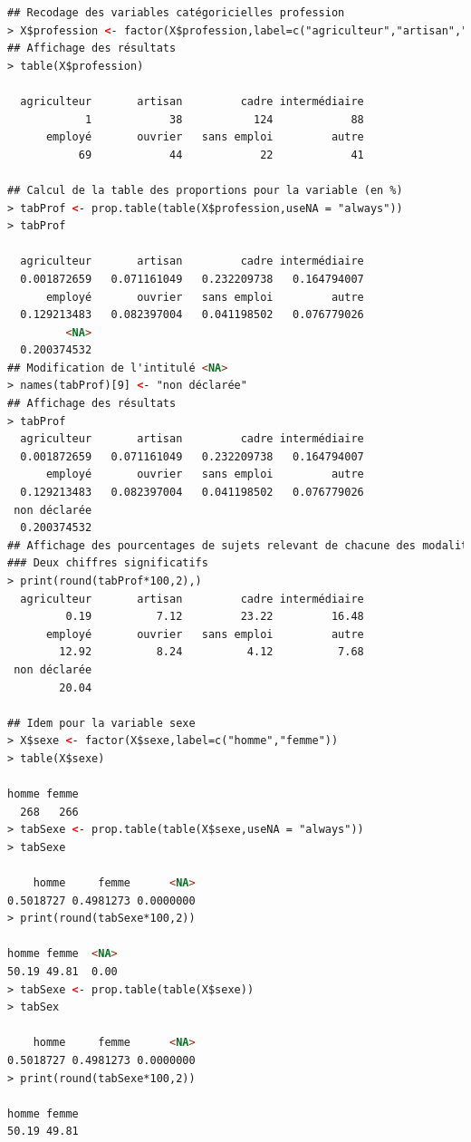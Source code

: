 \begin{lstlisting}[language=html]
## Recodage des variables catégoricielles profession
> X$profession <- factor(X$profession,label=c("agriculteur","artisan","cadre","intermédiaire","employé","ouvrier","sans emploi","autre"))
## Affichage des résultats 
> table(X$profession)

  agriculteur       artisan         cadre intermédiaire 
            1            38           124            88 
      employé       ouvrier   sans emploi         autre 
           69            44            22            41 

## Calcul de la table des proportions pour la variable (en %)           
> tabProf <- prop.table(table(X$profession,useNA = "always"))
> tabProf

  agriculteur       artisan         cadre intermédiaire 
  0.001872659   0.071161049   0.232209738   0.164794007 
      employé       ouvrier   sans emploi         autre 
  0.129213483   0.082397004   0.041198502   0.076779026 
         <NA> 
  0.200374532 
## Modification de l'intitulé <NA>
> names(tabProf)[9] <- "non déclarée"
## Affichage des résultats 
> tabProf
  agriculteur       artisan         cadre intermédiaire 
  0.001872659   0.071161049   0.232209738   0.164794007 
      employé       ouvrier   sans emploi         autre 
  0.129213483   0.082397004   0.041198502   0.076779026 
 non déclarée 
  0.200374532 
## Affichage des pourcentages de sujets relevant de chacune des modalités
### Deux chiffres significatifs 
> print(round(tabProf*100,2),)
  agriculteur       artisan         cadre intermédiaire 
         0.19          7.12         23.22         16.48 
      employé       ouvrier   sans emploi         autre 
        12.92          8.24          4.12          7.68 
 non déclarée 
        20.04 

## Idem pour la variable sexe
> X$sexe <- factor(X$sexe,label=c("homme","femme"))
> table(X$sexe)

homme femme 
  268   266 
> tabSexe <- prop.table(table(X$sexe,useNA = "always"))
> tabSexe

    homme     femme      <NA> 
0.5018727 0.4981273 0.0000000 
> print(round(tabSexe*100,2))

homme femme  <NA> 
50.19 49.81  0.00 
> tabSexe <- prop.table(table(X$sexe))
> tabSex

    homme     femme      <NA> 
0.5018727 0.4981273 0.0000000 
> print(round(tabSexe*100,2))

homme femme 
50.19 49.81 


\end{lstlisting}
